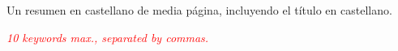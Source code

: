 
\begin{extraAbstract}
    \addchaptertocentry{\extraabstractname} %
Un resumen en castellano de media página, incluyendo el título en castellano. 
    
\end{extraAbstract}

\begin{keywordsSec}
\textit{\textcolor{red}{10 keywords max., separated by commas.}} \keywordnamesalt
\end{keywordsSec}
